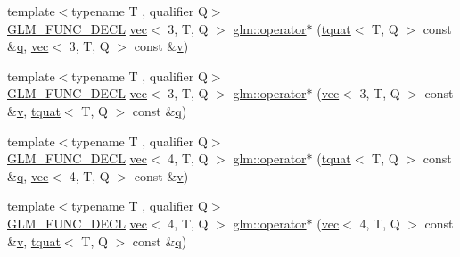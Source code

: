 \begin{DoxyCompactItemize}
\item 
{\footnotesize template$<$typename T , qualifier Q$>$ }\\\mbox{\hyperlink{setup_8hpp_ab2d052de21a70539923e9bcbf6e83a51}{G\+L\+M\+\_\+\+F\+U\+N\+C\+\_\+\+D\+E\+CL}} \mbox{\hyperlink{structglm_1_1vec}{vec}}$<$ 3, T, Q $>$ \mbox{\hyperlink{group__gtc__quaternion_ga01cacfba4a28b21e7af7cdbb122c4ef9}{glm\+::operator$\ast$}} (\mbox{\hyperlink{structglm_1_1tquat}{tquat}}$<$ T, Q $>$ const \&\mbox{\hyperlink{_s_d_l__opengl_8h_a8fc1e7b9baaae687804c7eed46ca09c6}{q}}, \mbox{\hyperlink{structglm_1_1vec}{vec}}$<$ 3, T, Q $>$ const \&\mbox{\hyperlink{_s_d_l__opengl_8h_a10a82eabcb59d2fcd74acee063775f90}{v}})
\item 
{\footnotesize template$<$typename T , qualifier Q$>$ }\\\mbox{\hyperlink{setup_8hpp_ab2d052de21a70539923e9bcbf6e83a51}{G\+L\+M\+\_\+\+F\+U\+N\+C\+\_\+\+D\+E\+CL}} \mbox{\hyperlink{structglm_1_1vec}{vec}}$<$ 3, T, Q $>$ \mbox{\hyperlink{group__gtc__quaternion_ga97f1c7e2d4ae80aad5d8813aed7d860e}{glm\+::operator$\ast$}} (\mbox{\hyperlink{structglm_1_1vec}{vec}}$<$ 3, T, Q $>$ const \&\mbox{\hyperlink{_s_d_l__opengl_8h_a10a82eabcb59d2fcd74acee063775f90}{v}}, \mbox{\hyperlink{structglm_1_1tquat}{tquat}}$<$ T, Q $>$ const \&\mbox{\hyperlink{_s_d_l__opengl_8h_a8fc1e7b9baaae687804c7eed46ca09c6}{q}})
\item 
{\footnotesize template$<$typename T , qualifier Q$>$ }\\\mbox{\hyperlink{setup_8hpp_ab2d052de21a70539923e9bcbf6e83a51}{G\+L\+M\+\_\+\+F\+U\+N\+C\+\_\+\+D\+E\+CL}} \mbox{\hyperlink{structglm_1_1vec}{vec}}$<$ 4, T, Q $>$ \mbox{\hyperlink{group__gtc__quaternion_ga69d38a6ce6b49b97147c26274ada8911}{glm\+::operator$\ast$}} (\mbox{\hyperlink{structglm_1_1tquat}{tquat}}$<$ T, Q $>$ const \&\mbox{\hyperlink{_s_d_l__opengl_8h_a8fc1e7b9baaae687804c7eed46ca09c6}{q}}, \mbox{\hyperlink{structglm_1_1vec}{vec}}$<$ 4, T, Q $>$ const \&\mbox{\hyperlink{_s_d_l__opengl_8h_a10a82eabcb59d2fcd74acee063775f90}{v}})
\item 
{\footnotesize template$<$typename T , qualifier Q$>$ }\\\mbox{\hyperlink{setup_8hpp_ab2d052de21a70539923e9bcbf6e83a51}{G\+L\+M\+\_\+\+F\+U\+N\+C\+\_\+\+D\+E\+CL}} \mbox{\hyperlink{structglm_1_1vec}{vec}}$<$ 4, T, Q $>$ \mbox{\hyperlink{group__gtc__quaternion_ga16c91c9dc2f0346faa3742888339b11d}{glm\+::operator$\ast$}} (\mbox{\hyperlink{structglm_1_1vec}{vec}}$<$ 4, T, Q $>$ const \&\mbox{\hyperlink{_s_d_l__opengl_8h_a10a82eabcb59d2fcd74acee063775f90}{v}}, \mbox{\hyperlink{structglm_1_1tquat}{tquat}}$<$ T, Q $>$ const \&\mbox{\hyperlink{_s_d_l__opengl_8h_a8fc1e7b9baaae687804c7eed46ca09c6}{q}})

\end{DoxyCompactItemize}
